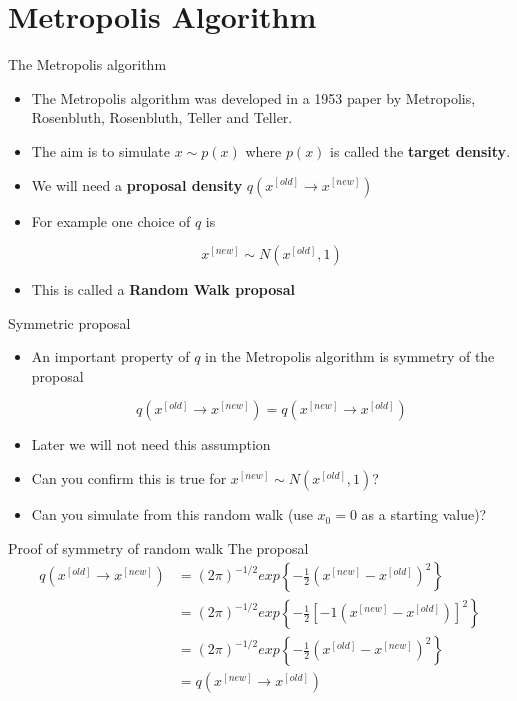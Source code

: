 \documentclass[10pt]{beamer}
\begin{document}
\section{Metropolis Algorithm}
\begin{frame}{The Metropolis algorithm}
\begin{itemize}
\item The Metropolis algorithm was developed in a 1953 paper by Metropolis, Rosenbluth, Rosenbluth, Teller and Teller.

\item The aim is to simulate $x\sim p(x)$ where $p(x)$ is called the {\bf target density}.

\item We will need a {\bf proposal density} $q(x^{[old]}\rightarrow x^{[new]})$

\item For example one choice of $q$ is

\begin{equation}
x^{[new]}\sim N(x^{[old]},1)
\end{equation}

\item This is called a {\bf Random Walk proposal}
\end{itemize}
\end{frame}
\begin{frame}{Symmetric proposal}
\begin{itemize}
\item An important property of $q$ in the Metropolis algorithm is symmetry of the proposal

\begin{equation}
q(x^{[old]}\rightarrow x^{[new]})=q(x^{[new]}\rightarrow x^{[old]})
\end{equation}

\item Later we will not need this  assumption

\item Can you confirm this is true for $x^{[new]}\sim N(x^{[old]},1)$?

\item Can you simulate from this random walk (use $x_0=0$ as a starting value)?
\end{itemize}
\end{frame}
\begin{frame}{Proof of symmetry of random walk}
The proposal
\begin{align}
q(x^{[old]}\rightarrow x^{[new]})&=(2\pi)^{-1/2}exp\left\{-\frac{1}{2}\left(x^{[new]}-x^{[old]}\right)^2\right\}\\
&=(2\pi)^{-1/2}exp\left\{-\frac{1}{2}\left[-1\left(x^{[new]}-x^{[old]}\right)\right]^2\right\}\\
&=(2\pi)^{-1/2}exp\left\{-\frac{1}{2}\left(x^{[old]}-x^{[new]}\right)^2\right\}\\
&=q(x^{[new]}\rightarrow x^{[old]})
\end{align}
\end{frame}
\end{document}

